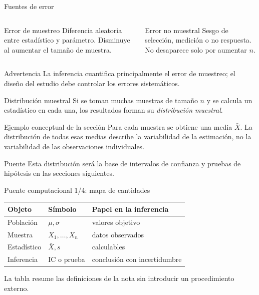 \documentclass[10pt,aspectratio=169]{beamer}
\begin{document}
\begin{frame}{Fuentes de error}
  \footnotesize
  \begin{columns}[T]
      \begin{block}{Error de muestreo}
        Diferencia aleatoria entre estadístico y parámetro. Disminuye al
        aumentar el tamaño de muestra.
      \end{block}
      \begin{block}{Error no muestral}
        Sesgo de selección, medición o no respuesta. No desaparece solo por
        aumentar $n$.
      \end{block}
  \end{columns}
  \begin{alertblock}{Advertencia}
    La inferencia cuantifica principalmente el error de muestreo; el diseño del
    estudio debe controlar los errores sistemáticos.
  \end{alertblock}
\end{frame}

\begin{frame}{Distribución muestral}
  \footnotesize
  Si se toman muchas muestras de tamaño $n$ y se calcula un estadístico en cada
  una, los resultados forman su \emph{distribución muestral}.
  \begin{block}{Ejemplo conceptual de la sección}
    Para cada muestra se obtiene una media $\bar X$. La distribución de todas
    esas medias describe la variabilidad de la estimación, no la variabilidad
    de las observaciones individuales.
  \end{block}
  \pause
  \begin{alertblock}{Puente}
    Esta distribución será la base de intervalos de confianza y pruebas de
    hipótesis en las secciones siguientes.
  \end{alertblock}
\end{frame}

\begin{frame}{Puente computacional 1/4: mapa de cantidades}
  \footnotesize
  \begin{tabular}{lll}
    \hline
    Objeto & Símbolo & Papel en la inferencia \\
    \hline
    Población & $\mu,\sigma$ & valores objetivo \\
    Muestra & $X_1,\ldots,X_n$ & datos observados \\
    Estadístico & $\bar X,s$ & calculables \\
    Inferencia & IC o prueba & conclusión con incertidumbre \\
    \hline
  \end{tabular}
  \vspace{0.15cm}
  La tabla resume las definiciones de la nota sin introducir un procedimiento
  externo.
\end{frame}
\end{document}
